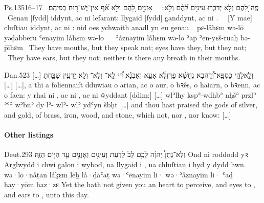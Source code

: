 \begin{example}{Ps.}{135}{16–17}{}{}
	\quoling
	{%
		~פֶּֽה־לָ֭הֶם וְלֹ֣א יְדַבֵּ֑רוּ עֵינַ֥יִם לָ֝הֶ֗ם וְלֹ֣א ׃\ %
		~אָזְנַ֣יִם לָ֭הֶם וְלֹ֣א  אַ֝֗ף אֵין־יֶשׁ־ר֥וּחַ בְּפִיהֶֽם׃
	}
	{%
		~Genau [ſydd] iddynt, ac ni lefarant: llygaid [ſydd] ganddynt, ac ni .\ %
		~[Y mae] cluſtiau iddynt, ac ni : nid oes ychwaith anadl yn eu genau.
	}
	{%
		~pɛ-lå̄hɛm wə-lō yəḏabbērū ʿēnayim lå̄hɛm wə-lō \ %
		~ʾå̄znayim lå̄hɛm wə-lō  ʾap̄ ʾēn-yɛš-rūaḥ bə-p̄īhɛm
	}
	{%
		~They have mouths, but they speak not; eyes have they, but they  not;\ %
		~They have ears, but they  not; neither is there any breath in their mouths.
	}
\end{example}

\begin{example}{Dan.}{5}{23}{}{}
	\quoling
	{[…] וְלֵֽאלָהֵ֣י כַסְפָּֽא־וְ֠דַהֲבָא נְחָשָׁ֨א פַרְזְלָ֜א אָעָ֣א וְאַבְנָ֗א דִּ֠י לָֽא־ וְלָא־ וְלָ֥א יָדְעִ֖ין שַׁבַּ֑חְתָּ […]}
	{[…], a thi a foliennaiſt dduwiau o arian, ac o aur, o bꝛês, o haiarn, o bꝛenn, ac o faen: y rhai ni , ac ni , ac ni ŵyddant [ddim:] […]}
	{wlʾlhy kspʾ-wdhbʾ nḥšʾ przlʾ ʾʿʾ wʾbnʾ dy lʾ- wlʾ- wlʾ ydʿyn šbḥt}
	{[…] and thou hast praised the gods of silver, and gold, of brass, iron, wood, and stone, which  not, nor , nor know: […]}
\end{example}



\paragraph{Other listings}

\begin{example}{Deut.}{29}{3}{}{}
	\quoling
	{וְלֹֽא־נָתַן֩ יְהוָ֨ה לָכֶ֥ם לֵב֙ לָדַ֔עַת וְעֵינַ֥יִם  וְאָזְנַ֣יִם  עַ֖ד הַיּ֥וֹם הַזֶּֽה׃}
	{Ond ni roddodd yꝛ Arglwydd i chwi galon i wybod, na llygaid i , na chluſtiau i  hyd y dydd hwn.}
	{wə·lō·nå̄ṯan {\YHWH} lå̄ḵɛm lēḇ lå̄·ḏaʿaṯ wə·ʿēnayim li· wə·ʾå̄znayim li· ʿaḏ hay·yōm haz·zɛ}
	{Yet the {\LORD} hath not given you an heart to perceive, and eyes to , and ears to , unto this day.}
\end{example}

